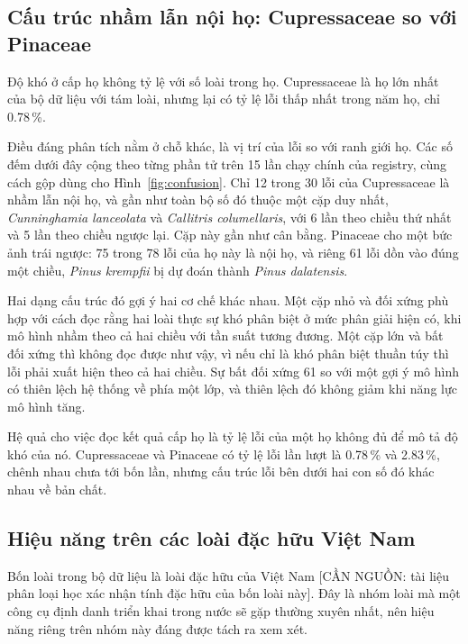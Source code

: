 \subsection{Cấu trúc nhầm lẫn nội họ: Cupressaceae so với Pinaceae}
\label{vi:sec:discussion:cupressaceae}

Độ khó ở cấp họ không tỷ lệ với số loài trong họ. Cupressaceae là họ lớn nhất
của bộ dữ liệu với tám loài, nhưng lại có tỷ lệ lỗi thấp nhất trong năm họ, chỉ
0.78\,\%.

Điều đáng phân tích nằm ở chỗ khác, là vị trí của lỗi so với ranh giới họ. Các
số đếm dưới đây cộng theo từng phần tử trên 15 lần chạy chính của registry,
cùng cách gộp dùng cho Hình~\ref{fig:confusion}. Chỉ 12 trong 30 lỗi của
Cupressaceae là nhầm lẫn nội họ, và gần như toàn bộ số đó
thuộc một cặp duy nhất, \textit{Cunninghamia lanceolata} và
\textit{Callitris columellaris}, với 6 lần theo chiều thứ nhất và 5 lần theo
chiều ngược lại. Cặp này gần như cân bằng. Pinaceae cho một bức ảnh trái ngược:
75 trong 78 lỗi của họ này là nội họ, và riêng 61 lỗi dồn vào đúng một chiều,
\textit{Pinus krempfii} bị dự đoán thành \textit{Pinus dalatensis}.

Hai dạng cấu trúc đó gợi ý hai cơ chế khác nhau. Một cặp nhỏ và đối xứng phù
hợp với cách đọc rằng hai loài thực sự khó phân biệt ở mức phân giải hiện có,
khi mô hình nhầm theo cả hai chiều với tần suất tương đương. Một cặp lớn và bất
đối xứng thì không đọc được như vậy, vì nếu chỉ là khó phân biệt thuần túy thì
lỗi phải xuất hiện theo cả hai chiều. Sự bất đối xứng 61 so với một gợi ý mô
hình có thiên lệch hệ thống về phía một lớp, và thiên lệch đó không giảm khi
năng lực mô hình tăng.

Hệ quả cho việc đọc kết quả cấp họ là tỷ lệ lỗi của một họ không đủ để mô tả độ
khó của nó. Cupressaceae và Pinaceae có tỷ lệ lỗi lần lượt là 0.78\,\% và
2.83\,\%, chênh nhau chưa tới bốn lần, nhưng cấu trúc lỗi bên dưới hai con số
đó khác nhau về bản chất.

\subsection{Hiệu năng trên các loài đặc hữu Việt Nam}
\label{vi:sec:discussion:endemic}

Bốn loài trong bộ dữ liệu là loài đặc hữu của Việt Nam
[CẦN NGUỒN: tài liệu phân loại học xác nhận tính đặc hữu của bốn loài này].
Đây là nhóm loài mà một công cụ định danh triển khai trong nước sẽ gặp thường
xuyên nhất, nên hiệu năng riêng trên nhóm này đáng được tách ra xem xét.

